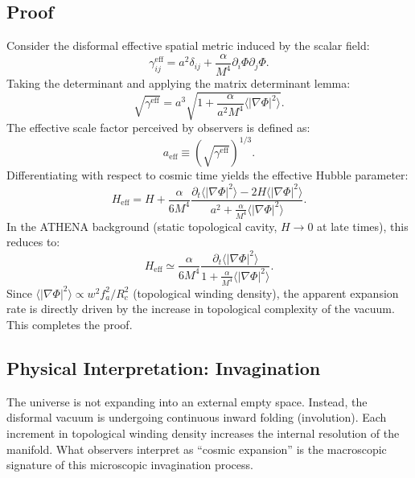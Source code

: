 \documentclass[11pt,a4paper]{article}
\begin{document}
\subsection{Proof}
Consider the disformal effective spatial metric induced by the scalar field:
\begin{equation}
\gamma_{ij}^{\mathrm{eff}} = a^2\delta_{ij} + \frac{\alpha}{M^4}\partial_i\Phi \partial_j\Phi . \tag{50}
\end{equation}
Taking the determinant and applying the matrix determinant lemma:
\begin{equation}
\sqrt{\gamma^{\mathrm{eff}}} = a^3\sqrt{1 + \frac{\alpha}{a^2M^4}\langle|\nabla\Phi|^2\rangle}. \tag{51}
\end{equation}
The effective scale factor perceived by observers is defined as:
\begin{equation}
a_{\mathrm{eff}}\equiv \left(\sqrt{\gamma^{\mathrm{eff}}}\right)^{1 / 3}. \tag{52}
\end{equation}
Differentiating with respect to cosmic time yields the effective Hubble parameter:
\begin{equation}
H_{\mathrm{eff}} = H + \frac{\alpha}{6M^4}\frac{\partial_t\langle|\nabla\Phi|^2\rangle - 2H\langle|\nabla\Phi|^2\rangle}{a^2 + \frac{\alpha}{M^4}\langle|\nabla\Phi|^2\rangle}. \tag{53}
\end{equation}
In the ATHENA background (static topological cavity, \(H\rightarrow 0\) at late times), this reduces to:
\begin{equation}
H_{\mathrm{eff}}\simeq \frac{\alpha}{6M^4}\frac{\partial_t\langle|\nabla\Phi|^2\rangle}{1 + \frac{\alpha}{M^4}\langle|\nabla\Phi|^2\rangle}. \tag{54}
\end{equation}
Since \(\langle |\nabla \Phi |^2\rangle \propto w^2 f_a^2 /R_c^2\) (topological winding density), the apparent expansion rate is directly driven by the increase in topological complexity of the vacuum. This completes the proof.

\subsection{Physical Interpretation: Invagination}
The universe is not expanding into an external empty space. Instead, the disformal vacuum is undergoing continuous inward folding (involution). Each increment in topological winding density increases the internal resolution of the manifold. What observers interpret as ``cosmic expansion'' is the macroscopic signature of this microscopic invagination process.
\end{document}
